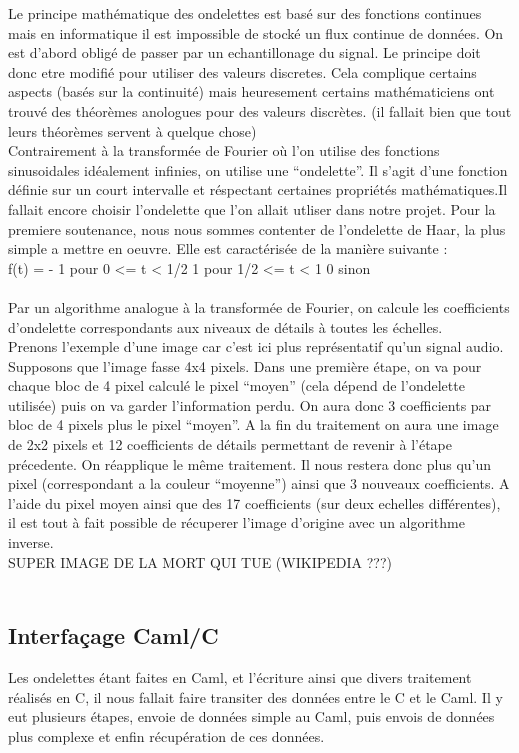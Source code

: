 \documentclass[a4paper,12pt]{article}
\begin{document}
Le principe mathématique des ondelettes est basé sur des fonctions continues
mais en informatique il est impossible de stocké un flux continue de données. On
est d'abord obligé de passer par un echantillonage du signal. Le principe doit
donc etre modifié pour utiliser des valeurs discretes. Cela complique certains
aspects (basés sur la continuité) mais heuresement certains mathématiciens ont
trouvé des théorèmes anologues pour des valeurs discrètes. (il fallait bien que
tout leurs théorèmes servent à quelque chose)\\
Contrairement à la transformée de Fourier où l'on utilise des fonctions
sinusoidales idéalement infinies, on utilise une ``ondelette''. Il s'agit d'une
fonction définie sur un court intervalle et réspectant certaines propriétés
mathématiques.Il fallait encore choisir l'ondelette que l'on allait utliser dans
notre projet.  Pour la premiere soutenance, nous nous sommes contenter de
l'ondelette de Haar, la plus simple a mettre en oeuvre. Elle est caractérisée de
la manière suivante :\\

f(t) = 
- 1 pour 0 <= t < 1/2
1 pour 1/2 <= t < 1
0 sinon
\\\\

Par un algorithme analogue à la transformée de Fourier, on calcule les
coefficients d'ondelette correspondants aux niveaux de détails à toutes les
échelles.\\
Prenons l'exemple d'une image car c'est ici plus représentatif qu'un signal
audio. Supposons que l'image fasse 4x4 pixels. Dans une première étape, on va
pour chaque bloc de 4 pixel calculé le pixel ``moyen'' (cela dépend de
l'ondelette utilisée) puis on va garder l'information perdu. On aura donc 3
coefficients par bloc de 4 pixels plus le pixel ``moyen''. A la fin du
traitement on aura une image de 2x2 pixels et 12 coefficients de détails
permettant de revenir à l'étape précedente. On réapplique le même traitement. Il
nous restera donc plus qu'un pixel (correspondant a la couleur ``moyenne'')
ainsi que 3 nouveaux coefficients. A l'aide du pixel moyen ainsi que des 17
coefficients (sur deux echelles différentes), il est tout à fait possible de
récuperer l'image d'origine avec un algorithme inverse.\\

SUPER IMAGE DE LA MORT QUI TUE (WIKIPEDIA ???)
\\\\

	\subsection{Interfaçage Caml/C}
Les ondelettes étant faites en Caml, et l'écriture ainsi que divers traitement
réalisés en C, il nous fallait faire transiter des données entre le C et le
Caml. Il y eut plusieurs étapes, envoie de données simple au Caml, puis envois
de données plus complexe et enfin récupération de ces données.\\
\end{document}

